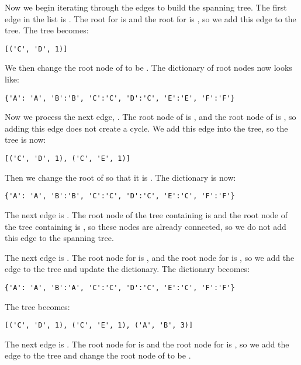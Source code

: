 Now we begin iterating through the edges to build the spanning tree.
The first edge in the list is .
The root for  is  and the root for  is , so we add this edge to the tree.
The tree becomes:
\begin{lstlisting}
[('C', 'D', 1)]
\end{lstlisting}
We then change the root node of  to be .
The dictionary of root nodes now looks like:

\begin{lstlisting}
{'A': 'A', 'B':'B', 'C':'C', 'D':'C', 'E':'E', 'F':'F'}
\end{lstlisting}

Now we process the next edge, .
The root node of  is , and the root node of  is , so adding this edge does not create a cycle.
We add this edge into the tree, so the tree is now:

\begin{lstlisting}
[('C', 'D', 1), ('C', 'E', 1)]
\end{lstlisting}
Then we change the root of  so that it is . The dictionary is now:

\begin{lstlisting}
{'A': 'A', 'B':'B', 'C':'C', 'D':'C', 'E':'C', 'F':'F'}
\end{lstlisting}

The next edge is .
The root node of the tree containing  is  and the root node of the tree containing  is , so these nodes are already connected, so we do not add this edge to the spanning tree.

The next edge is .
The root node for  is , and the root node for  is , so we add the edge to the tree and update the dictionary.
The dictionary becomes:

\begin{lstlisting}
{'A': 'A', 'B':'A', 'C':'C', 'D':'C', 'E':'C', 'F':'F'}
\end{lstlisting}
The tree becomes:
\begin{lstlisting}
[('C', 'D', 1), ('C', 'E', 1), ('A', 'B', 3)]
\end{lstlisting}

The next edge is .
The root node for  is  and the root node for  is , so we add the edge to the tree and change the root node of  to be .

